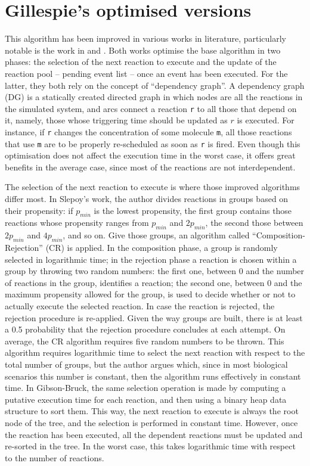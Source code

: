 \documentclass[12pt,a4paper,twoside,openright]{book}
\begin{document}
\section{Gillespie's optimised versions}
This algorithm has been improved in various works in literature, particularly notable is the work in \cite{gibson2000} and \cite{slepoy2008}.
%
Both works optimise the base algorithm in two phases: the selection of the next reaction to execute and the update of the reaction pool -- pending event list -- once an event has been executed.
%
For the latter, they both rely on the concept of ``dependency graph''.
%
A dependency graph (DG) is a statically created directed graph in which nodes are all the reactions in the simulated system, and arcs connect a reaction \texttt{r} to all those that depend on it, namely, those whose triggering time should be updated as $r$ is executed.
%
For instance, if \texttt{r} changes the concentration of some molecule \texttt{m}, all those reactions that use \texttt{m} are to be properly re-scheduled as soon as \texttt{r} is fired.
%
Even though this optimisation does not affect the execution time in the worst case, it offers great benefits in the average case, since most of the reactions are not interdependent.

The selection of the next reaction to execute is where those improved algorithms differ most.
%
In Slepoy's work, the author divides reactions in groups based on their propensity: if $p_{min}$ is the lowest propensity, the first group contains those reactions whose propensity ranges from $p_{min}$ and $2 p_{min}$, the second those between $2 p_{min}$ and $4 p_{min}$, and so on.
%
Give those groups, an algorithm called ``Composition-Rejection'' (CR) is applied.
%
In the composition phase, a group is randomly selected in logarithmic time; in the rejection phase a reaction is chosen within a group by throwing two random numbers: the first one, between $0$ and the number of reactions in the group, identifies a reaction; the second one, between $0$ and the maximum propensity allowed for the group, is used to decide whether or not to actually execute the selected reaction.
%
In case the reaction is rejected, the rejection procedure is re-applied.
%
Given the way groups are built, there is at least a 0.5 probability that the rejection procedure concludes at each attempt.
%
On average, the CR algorithm requires five random numbers to be thrown.
%
This algorithm requires logarithmic time to select the next reaction with respect to the total number of groups, but the author argues which, since in most biological scenarios this number is constant, then the algorithm runs effectively in constant time.
%
In Gibson-Bruck, the same selection operation is made by computing a putative execution time for each reaction, and then using a binary heap data structure to sort them.
%
This way, the next reaction to execute is always the root node of the tree, and the selection is performed in constant time.
%
However, once the reaction has been executed, all the dependent reactions must be updated and re-sorted in the tree. In the worst case, this takes logarithmic time with respect to the number of reactions.
\end{document}
